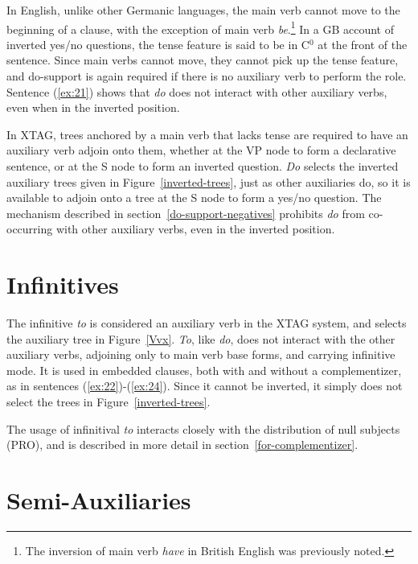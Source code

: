  
In English, unlike other Germanic languages, the main verb cannot move to the 
beginning of a clause, with the exception of main verb {\it be}.\footnote{The inversion of main verb {\it have} in British English was previously noted.}  In 
a GB account of inverted yes/no questions, the tense feature is said to be in 
C$^{0}$ at the front of the sentence.  Since main verbs cannot move, they 
cannot pick up the tense feature, and do-support is again required if there is 
no auxiliary verb to perform the role.  Sentence (\ref{ex:21}) shows that {\it do} 
does not interact with other auxiliary verbs, even when in the inverted 
position. 
 
In XTAG, trees anchored by a main verb that lacks tense are required to have an 
auxiliary verb adjoin onto them, whether at the VP node to form a declarative 
sentence, or at the S node to form an inverted question.  {\it Do} selects the 
inverted auxiliary trees given in Figure~\ref{inverted-trees}, just as other 
auxiliaries do, so it is available to adjoin onto a tree at the S node to form 
a yes/no question.  The mechanism described in 
section~\ref{do-support-negatives} prohibits {\it do} from co-occurring with 
other auxiliary verbs, even in the inverted position. 
 
 
\section{Infinitives} 
 
The infinitive {\it to} is considered an auxiliary verb in the XTAG system, and 
selects the auxiliary tree in Figure~\ref{Vvx}.  {\it To}, like {\it do}, does 
not interact with the other auxiliary verbs, adjoining only to main verb base 
forms, and carrying infinitive mode.  It is used in embedded clauses, both with 
and without a complementizer, as in sentences (\ref{ex:22})-(\ref{ex:24}).  Since it 
cannot be inverted, it simply does not select the trees in 
Figure~\ref{inverted-trees}. 
 
\beginsentences
{}\label{ex:22} 
\label{ex:23} 
\label{ex:24} 
\endsentences

 
The usage of infinitival {\em to} interacts closely with the distribution of 
null subjects (PRO), and is described in more detail in 
section~\ref{for-complementizer}. 
 
\section{Semi-Auxiliaries} 
 
